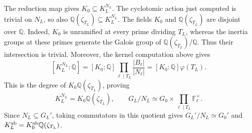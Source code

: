 The reduction map gives $K_0\subseteq K_L^{N_L}$. The cyclotomic
action just computed is trivial on $N_L$, so also
$\mathbb Q(\zeta_{T_L})\subseteq K_L^{N_L}$.
The fields $K_0$ and $\mathbb Q(\zeta_{T_L})$ are disjoint over
$\mathbb Q$. Indeed, $K_0$ is unramified at every prime dividing
$T_L$, whereas the inertia groups at these primes generate the
Galois group of $\mathbb Q(\zeta_{T_L})/\mathbb Q$. Thus their
intersection is trivial. Moreover, the kernel computation above gives
\[
 [K_L^{N_L}:\mathbb Q]
 =[K_0:\mathbb Q]\prod_{\ell\mid T_L}\frac{|B_\ell|}{|N_\ell|}
 =[K_0:\mathbb Q]\varphi(T_L).
\]
This is the degree of $K_0\mathbb Q(\zeta_{T_L})$, proving
\[
 K_L^{N_L}=K_0\mathbb Q(\zeta_{T_L}),\qquad
 G_L/N_L\simeq G_0\times\prod_{\ell\mid T_L}\mathbb F_\ell^\times.
\]
Since $N_L\subseteq G_L'$, taking commutators in this quotient gives
$G_L'/N_L\simeq G_0'$ and
$K_L^{\rm ab}=K_0^{\rm ab}\mathbb Q(\zeta_{T_L})$.
